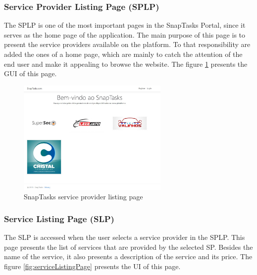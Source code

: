 \subsubsection{Service Provider Listing Page (SPLP)}

The \gls{SPLP} is one of the most important pages in the SnapTasks Portal, since it serves as the home page of the application. The main purpose of this page is to present the service providers available on the platform. To that responsibility are added the ones of a home page, which are mainly to catch the attention of the end user and make it appealing to browse the website. The figure \ref{fig:snaptasksSPLP} presents the \gls{GUI} of this page.

\begin{figure}[ht]
\centering
\includegraphics[width=0.65\textwidth,keepaspectratio]{chapters/Implementation/assets/snaptasks-splp.jpg}
\caption[SnapTasks service provider listing page]{SnapTasks service provider listing page}
\label{fig:snaptasksSPLP}
\end{figure}

\clearpage
\subsubsection{Service Listing Page (SLP)}
\label{sub:service-listing-page}
The \gls{SLP} is accessed when the user selects a service provider in the \gls{SPLP}. This page presents the list of services that are provided by the selected \gls{SP}. Besides the name of the service, it also presents a description of the service and its price. The figure \ref{fig:serviceListingPage} presents the \gls{UI} of this page.


